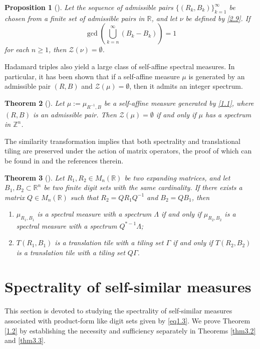 \documentclass[11pt]{article}
\newtheorem{theorem}{Theorem}[section]
\newtheorem{proposition}[theorem]{Proposition}
\numberwithin{equation}{section}
\begin{document}
\begin{proposition}[\cite{Li2024}] \label{2.10}
	Let the sequence of admissible pairs $\{(R_k,B_k)\}^{\infty}_{k=1}$ be chosen from a finite set of admissible pairs in $\mathbb{R}$, and let $\nu$ be defined by \eqref{2.9}. If
	\begin{equation*}	\gcd\left(\bigcup^{\infty}_{k=n}\left(B_k-B_k\right)\right)=1
	\end{equation*}
	for each $n \ge 1$, then $\mathcal{Z}(\nu)=\emptyset$.
\end{proposition}
Hadamard triples also yield a large class of self-affine spectral measures. In particular,  it has been shown  that if a self-affine measure $\mu$ is generated by an admissible pair $(R, B)$ and  $\mathcal{Z}(\mu)=\emptyset$, then it admits an integer spectrum.
\begin{theorem}[\cite{Dut-Hau-Lai2019}] \label{2.12}
	Let $\mu:=\mu_{R^{-1},B}$ be a self-affine measure generated by \eqref{1.1}, where $(R,B)$ is an admissible pair.
	Then $\mathcal{Z}(\mu)= \emptyset$ if and only if
	$\mu$ has a spectrum in $\mathbb{Z}^n$.
\end{theorem}


The similarity transformation implies that both spectrality and translational tiling are preserved under the action of matrix operators, the proof of which can be found in \cite{Chen-Liu-Zheng2024} and the references therein.
	\begin{theorem}[\cite{Chen-Liu-Zheng2024}] \label{2.7}
		Let $R_1,R_2 \in M_n(\mathbb{R})$ be two expanding matrices, and let $B_1,B_2 \subset \mathbb{R}^n$ be two finite digit sets with the same cardinality. If there exists a matrix $Q \in M_n(\mathbb{R})$ such that $R_2=QR_1Q^{-1}$ and $B_2=QB_1$, then
		\vspace{-0.2cm}
		\begin{enumerate}[\rm(i)]
			\item $\mu_{R_1,B_1}$ is a spectral measure with a spectrum $\Lambda$ if and only if $\mu_{R_2,B_2}$ is a spectral measure with a spectrum $Q^{\ast -1} \Lambda$;\vspace{-0.2cm}
			\item $T(R_1,B_1)$  is a translation tile with a tiling set $\Gamma$ if and only if $T(R_2,B_2)$ is a translation tile with a tiling set $Q \Gamma$.
		\end{enumerate}
\end{theorem}


\section{Spectrality of self-similar measures}\label{sec3}
This section is devoted to studying the spectrality of self-similar measures associated with product-form like digit sets given by \eqref{eq1.3}. We prove Theorem \ref{1.2} by establishing the necessity and sufficiency separately in Theorems \ref{thm3.2} and \ref{thm3.3}.
\end{document}

